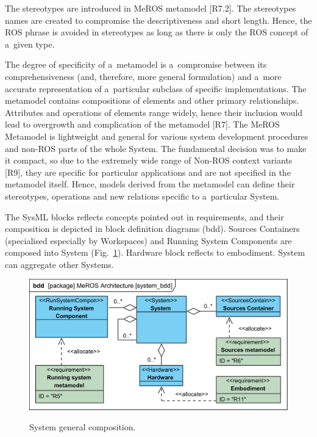 \documentclass[11pt,oneside,a4paper]{report}
\begin{document}
	The stereotypes are introduced in MeROS metamodel [R7.2].
	The stereotypes names are created to compromise the descriptiveness and short length. Hence, the ROS phrase is avoided in stereotypes as long as there is only the ROS concept of a~given type.
	
	The degree of specificity of a~metamodel is a~compromise between its comprehensiveness (and, therefore, more general formulation) and a~more accurate representation of a~particular subclass of specific implementations. The metamodel contains compositions of elements and other primary relationships. Attributes and operations of elements range widely, hence their inclusion would lead to overgrowth and complication of the metamodel [R7]. The MeROS Metamodel is lightweight and general for various system development procedures and non-ROS parts of the whole System. The fundamental decision was to make it compact, so due to the extremely wide range of Non-ROS context variants [R9], they are specific for particular applications and are not specified in the metamodel itself. Hence, models derived from the metamodel can define their stereotypes, operations and new relations specific to a~particular System. 
	
	The SysML blocks reflects concepts pointed out in requirements, and their composition is depicted in block definition diagrams (bdd). Sources Containers (specialised especially by Workspaces) and Running System Components are composed into System (Fig.~\ref{fig:ros_system_bdd}). Hardware block reflects to embodiment. System can aggregate other Systems.
	
		
	\begin{figure}[H]
		\centering
		\begin{center}
			{\includegraphics[scale=.98]{diagrams/system_bdd.png}}
		\end{center}
		\caption{System general composition.} 
		\label{fig:ros_system_bdd}
	\end{figure}
	
\end{document}
